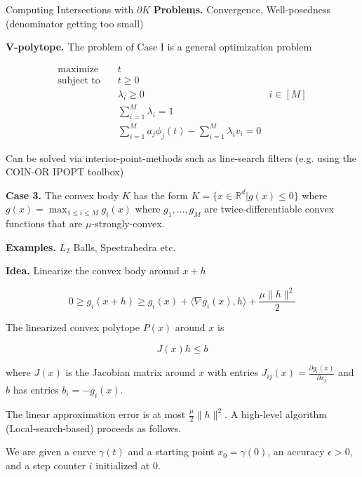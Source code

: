 \documentclass[10pt]{beamer}
\begin{document}
\begin{frame}[allowframebreaks]{Computing Intersections with $\partial K$}
    \textbf{Problems.} Convergence, Well-posedness (denominator getting too small)

    \framebreak
    
    \textbf{V-polytope.} The problem of Case I is a general optimization problem 
    
    \begin{align*}
        \text{maximize} \quad & t & \\
        \text{subject to} \quad & t \ge 0 \\
        & \lambda_i \ge 0 & i \in [M] \\
        & \sum_{i = 1}^M \lambda_i = 1 \\
        & \sum_{i = 1}^M a_j \phi_j(t) - \sum_{i = 1}^M \lambda_i v_i = 0 
    \end{align*}
    

    Can be solved via interior-point-methods such as line-search filters (e.g. using the COIN-OR IPOPT toolbox)

    \framebreak
    
    \textbf{Case 3.} The convex body $K$ has the form $K = \{ x \in \mathbb R^d | g(x) \le 0 \}$ where $g(x) = \max_{1 \le i \le M} g_i(x)$ where $g_1, \dots, g_M$ are twice-differentiable convex functions that are $\mu$-strongly-convex. 
    
    \medskip
    
    \textbf{Examples.} $L_2$ Balls, Spectrahedra etc.
    
    \medskip
    
    \textbf{Idea.} Linearize the convex body around $x + h$
    
    $$0 \ge g_i(x + h) \ge g_i(x) + \langle \nabla g_i(x), h \rangle + \frac {\mu \| h \|^2}  2 $$
    
    The linearized convex polytope $P(x)$ around $x$ is 
    
    $$J(x) h \le b$$
    
    where $J(x)$ is the Jacobian matrix around $x$ with entries $J_{ij}(x) = \frac {\partial g_i(x)} {\partial x_j}$ and $b$ has entries $b_i = -g_i(x)$.
    
    \framebreak 
    
    The linear approximation error is at most $\frac {\mu} 2 \| h \|^2$.     A high-level algorithm (Local-search-based) proceeds as follows.
    
    \medskip

    We are given a curve $\gamma(t)$ and a starting point $x_0 = \gamma(0)$, an accuracy $\epsilon > 0$, and a step counter $i$ initialized at 0.
    

\end{frame}
\end{document}
